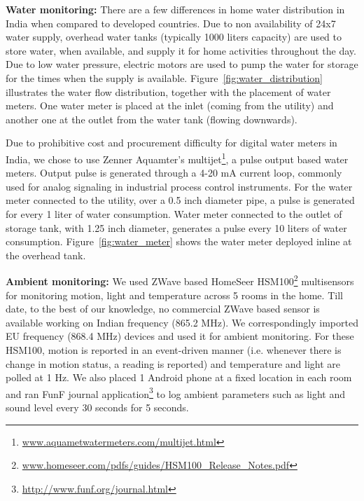 \documentclass[10pt]{sensys-proc}
\newcommand{\figref}[1]{Figure~\ref{#1}}
\begin{document}
\noindent \textbf{Water monitoring:} There are a few differences in home water distribution in India when compared to developed countries. Due to non availability of 24x7 water supply, overhead water tanks (typically 1000 liters capacity) are used to store water, when available, and supply it for home activities throughout the day. Due to low water pressure, electric motors are used to pump the water for storage for the times when the supply is available. %
\figref{fig:water_distribution} illustrates the water flow distribution, together with the placement of water meters. One water meter is placed at the inlet (coming from the utility) and another one at the outlet from the water tank (flowing downwards). %

Due to prohibitive cost and procurement difficulty for digital water meters in India, we chose to use Zenner Aquamter's multijet\footnote{\url{www.aquametwatermeters.com/multijet.html}}, a pulse output based water meters. Output pulse is generated through a 4-20 mA current loop, commonly used for analog signaling in industrial process control instruments. For the water meter connected to the utility, over a 0.5 inch diameter pipe, a pulse is generated for every 1 liter of water consumption. Water meter connected to the outlet of storage tank, with 1.25 inch diameter, generates a pulse every 10 liters of water consumption. %
\figref{fig:water_meter} shows the water meter deployed inline at the overhead tank.

\noindent \textbf{Ambient monitoring:} We used ZWave based HomeSeer HSM100\footnote{\url{www.homeseer.com/pdfs/guides/HSM100_Release_Notes.pdf}} multisensors for monitoring motion, light and temperature across 5 rooms in the home. Till date, to the best of our knowledge, no commercial ZWave based sensor is available working on Indian frequency (865.2 MHz). We correspondingly imported EU frequency (868.4 MHz) devices and used it for ambient monitoring. For these HSM100, motion is reported in an event-driven manner (i.e. whenever there is change in motion status, a reading is reported) and temperature and light are polled at 1 Hz. We also placed 1 Android phone at a fixed location in each room and ran FunF journal application\footnote{\url{http://www.funf.org/journal.html}} to log ambient parameters such as light and sound level every 30 seconds for 5 seconds.
\end{document}
